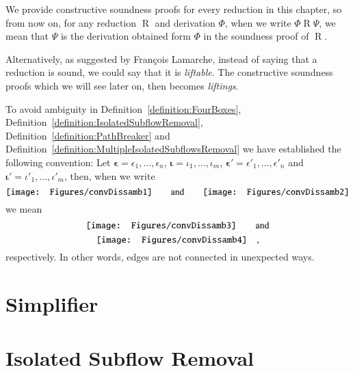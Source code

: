 
\begin{convention}
We provide constructive soundness proofs for every reduction in this chapter, so from now on, for any reduction $\mathrel{R}$ and derivation $\Phi$, when we write $\Phi\mathrel{R}\Psi$, we mean that $\Psi$ is the derivation obtained form $\Phi$ in the soundness proof of $\mathrel{R}$.
\end{convention}

\begin{remark}\label{remark:lifting}
Alternatively, as suggested by Fran\c{c}ois Lamarche, instead of saying that a reduction is sound, we could say that it is \emph{liftable}. The constructive soundness proofs which we will see later on, then becomes \emph{liftings}.
\end{remark}

\begin{convention}
To avoid ambiguity in Definition~\vref{definition:FourBoxes}, Definition~\vref{definition:IsolatedSubflowRemoval}, Definition~\vref{definition:PathBreaker} and Definition~\vref{definition:MultipleIsolatedSubflowsRemoval} we have established the following convention:
Let $\boldsymbol\epsilon=\epsilon_1,\dots,\epsilon_n$, $\boldsymbol\iota=\iota_1,\dots,\iota_m$, $\boldsymbol{\epsilon'}=\epsilon'_1,\dots,\epsilon'_n$ and $\boldsymbol{\iota'}=\iota'_1,\dots,\iota'_m$, then, when we write
\[
\vcenter{\hbox{\texttt{[image: Figures/convDissamb1]}}}
\qquad\mbox{and}\qquad
\vcenter{\hbox{\texttt{[image: Figures/convDissamb2]}}}
\]
we mean
\[
\vcenter{\hbox{\texttt{[image: Figures/convDissamb3]}}}
\qquad\mbox{and}
\]
\[
\vcenter{\hbox{\texttt{[image: Figures/convDissamb4]}}}
\quad,
\]
respectively. In other words, edges are not connected in unexpected ways.
\end{convention}

\section{Simplifier}\label{section:Simplifier}



\section{Isolated Subflow Removal}\label{section:IsolatedSubflowRemoval}

